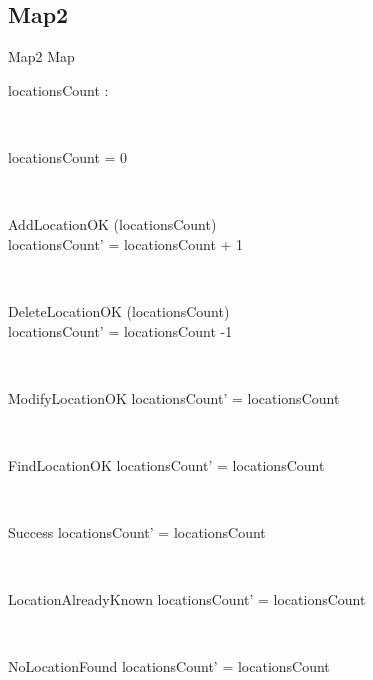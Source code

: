 \documentclass[12pt]{article}
\begin{document}
\begin{spacing}{1.5}
\section{Map2}
\begin{class}{Map2}
\also
Map \\
\begin{state}
locationsCount : 
\end{state} \\
\begin{init}
locationsCount = 0
\end{init} \\
\begin{op}{AddLocationOK}
\Delta (locationsCount) \\
\ST
locationsCount' = locationsCount + 1
\end{op}\\
\begin{op}{DeleteLocationOK}
\Delta (locationsCount) \\
\ST
locationsCount' = locationsCount -1
\end{op}\\
\begin{op}{ModifyLocationOK}
\ST
locationsCount' = locationsCount
\end{op}\\ 
\begin{op}{FindLocationOK}
\ST
locationsCount' = locationsCount
\end{op}\\
\begin{op}{Success}
\ST
locationsCount' = locationsCount
\end{op}\\
\begin{op}{LocationAlreadyKnown}
\ST
locationsCount' = locationsCount
\end{op}\\ 
\begin{op}{NoLocationFound}
\ST
locationsCount' = locationsCount
\end{op}\\
\end{class}




\end{spacing}
\end{document}
